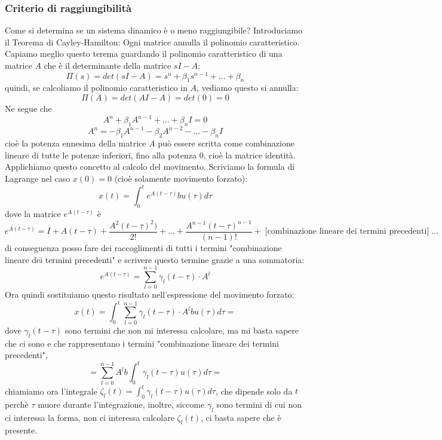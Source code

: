 \subsubsection{Criterio di raggiungibilità}
Come si determina se un sistema dinamico è o meno raggiungibile?\newline
\newline
Introduciamo il Teorema di Cayley-Hamilton: Ogni matrice annulla il polinomio caratteristico.\newline
Capiamo meglio questo terema guardando il polinomio caratteristico di una matrice $A$ che è il determinante della matrice $sI-A$:
\[
    \Pi(s) = det(sI-A) = s^n + \beta_1 s^{n-1} + \dots + \beta_n
\]
quindi, se calcoliamo il polinomio caratteristico in $A$, vediamo questo si annulla:
\[
    \Pi(A) = det(AI-A) = det(0) = 0
\]
Ne segue che
\[
    A^n + \beta_1 A^{n-1} + \dots + \beta_n I = 0
\]
\[
    A^n = -\beta_1 A^{n-1} - \beta_2 A^{n-2} - \dots - \beta_n I
\]
cioè la potenza ennesima della matrice $A$ può essere scritta come combinazione lineare di tutte le potenze inferiori, fino alla potenza $0$, cioè la matrice identità.\newline
\newline
Applichiamo questo concetto al calcolo del movimento.\newline
Scriviamo la formula di Lagrange nel caso $x(0) = 0$ (cioè solamente movimento forzato):
\[
    x(t) = \int_{0}^{t}e^{A(t-\tau)} b u(\tau) d \tau
\]
dove la matrice $e^{A(t - \tau)}$ è
\[
    e^{A(t - \tau)} = I +A(t-\tau) + \frac{A^2(t-\tau)^2)}{2!} + \dots + \frac{A^{n-1} (t - \tau)^{n-1}}{(n-1)!} +\; \text{[combinazione lineare dei termini precedenti]}\;\dots 
\]
di conseguenza posso fare dei raccoglimenti di tutti i termini "combinazione lineare dei termini precedenti" e scrivere questo termine grazie a una sommatoria:
\[
    e^{A(t - \tau)} = \sum_{l=0}^{n-1} \gamma_l(t-\tau) \cdot  A^l
\]
Ora quindi sostituiamo questo risultato nell'espressione del movimento forzato:
\[
    x(t) = \int_{0}^{t} \sum_{l=0}^{n-1} \gamma_l(t-\tau) \cdot  A^l b u(\tau)d \tau=
\]
dove $\gamma_l(t-\tau)$ sono termini che non mi interessa calcolare, ma mi basta sapere che ci sono e che rappresentano i termini "combinazione lineare dei termini precedenti",
\[
    = \sum_{l=0}^{n-1} A^l b \int_{0}^{t}\gamma_l (t-\tau) u(\tau)d \tau=
\]
chiamiamo ora l'integrale $\zeta_l (t) = \int_{0}^{t}\gamma_l (t-\tau) u(\tau)d \tau$, che dipende solo da $t$ perchè $\tau$ muore durante l'integrazione, inoltre, siccome $\gamma_l$ sono termini di cui non ci interessa la forma, non ci interessa calcolare $\zeta_l (t)$, ci basta sapere che è presente.\newline
